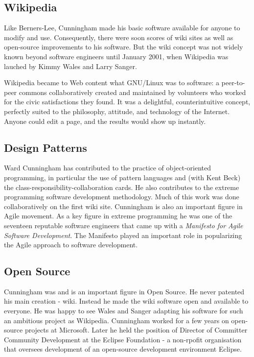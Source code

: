 \documentclass[11pt]{article}
\begin{document}
\subsection{Wikipedia}
\par
Like Berners-Lee, Cunningham made his basic software available for anyone to modify and use. Consequently, there were soon scores of wiki sites as well as open-source improvements to his software. But the wiki concept was not widely known beyond software engineers until January 2001, when Wikipedia was lauched by Kimmy Wales and Larry Sanger.\cite{innovators}\cite{wiki-wikipedia}

Wikipedia became to Web content what GNU/Linux was to software: a peer-to-peer commons collaboratively created and maintained by volunteers who worked for the civic satisfactions they found. It was a delightful, counterintuitive concept, perfectly suited to the philosophy, attitude, and technology of the Internet. Anyone could edit a page, and the results would show up instantly.\cite{innovators}

\subsection{Design Patterns}
Ward Cunningham has contributed to the practice of object-oriented programming, in particular the use of pattern languages and (with Kent Beck) the class-responsibility-collaboration cards. He also contributes to the extreme programming software development methodology. Much of this work was done collaboratively on the first wiki site. Cunningham is also an important figure in Agile movement. As a key figure in extreme programming he was one of the seventeen reputable software engineers that came up with a \textit{Manifesto for Agile Software Development}. The Manifesto played an important role in popularizing the Agile approach to software development. \cite{agile-manifesto}\cite{wiki-cunningham}
\subsection{Open Source}
\par
Cunningham was and is an important figure in Open Source. He never patented his main creation - wiki. Instead he made the wiki software open and available to everyone. He was happy to see  Wales and Sanger adapting his software for such an ambitious project as Wikipedia.\cite{innovators}
Cunningham worked for a few years on open-source projects at Microsoft. Later he held the position of Director of Committer Community Development at the Eclipse Foundation - a non-rpofit organisation that oversees development of an open-source development environment Eclipse.
\end{document}
